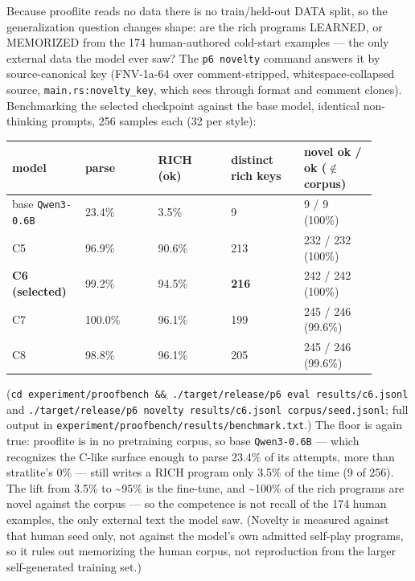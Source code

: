 \documentclass[11pt]{article}
\newcommand{\code}[1]{\texttt{#1}}
\begin{document}
Because prooflite reads no data there is no train/held-out DATA split, so the
generalization question changes shape: are the rich programs LEARNED, or
MEMORIZED from the 174 human-authored cold-start examples --- the only external
data the model ever saw? The \code{p6 novelty} command answers it by source-canonical
key (FNV-1a-64 over comment-stripped, whitespace-collapsed source,
\code{main.rs:novelty\_key}, which sees through format and comment clones).
Benchmarking the selected checkpoint against the base model, identical
non-thinking prompts, 256 samples each (32 per style):

\begingroup\small
\begin{longtable}{p{0.180\linewidth} p{0.180\linewidth} p{0.180\linewidth} p{0.180\linewidth} p{0.180\linewidth}}
\toprule
\textbf{model} & \textbf{parse} & \textbf{RICH (ok)} & \textbf{distinct rich keys} & \textbf{novel ok / ok ($\notin$ corpus)} \\
\midrule\endhead
base \code{Qwen3-0.6B} & 23.4\% & 3.5\% & 9 & 9 / 9 (100\%) \\
C5 & 96.9\% & 90.6\% & 213 & 232 / 232 (100\%) \\
\textbf{C6 (selected)} & 99.2\% & 94.5\% & \textbf{216} & 242 / 242 (100\%) \\
C7 & 100.0\% & 96.1\% & 199 & 245 / 246 (99.6\%) \\
C8 & 98.8\% & 96.1\% & 205 & 245 / 246 (99.6\%) \\
\bottomrule
\end{longtable}\endgroup

(\code{cd experiment/proofbench \&\& ./target/release/p6 eval results/c6.jsonl} and
\code{./target/release/p6 novelty results/c6.jsonl corpus/seed.jsonl}; full output in
\code{experiment/proofbench/results/benchmark.txt}.) The floor is again true:
prooflite is in no pretraining corpus, so base \code{Qwen3-0.6B} --- which recognizes
the C-like surface enough to parse 23.4\% of its attempts, more than stratlite's
0\% --- still writes a RICH program only 3.5\% of the time (9 of 256). The lift from
3.5\% to \textasciitilde{}95\% is the fine-tune, and \textasciitilde{}100\% of the rich programs are novel against
the corpus --- so the competence is not recall of the 174 human examples, the only
external text the model saw. (Novelty is measured against that human seed only,
not against the model's own admitted self-play programs, so it rules out
memorizing the human corpus, not reproduction from the larger self-generated
training set.)
\end{document}
